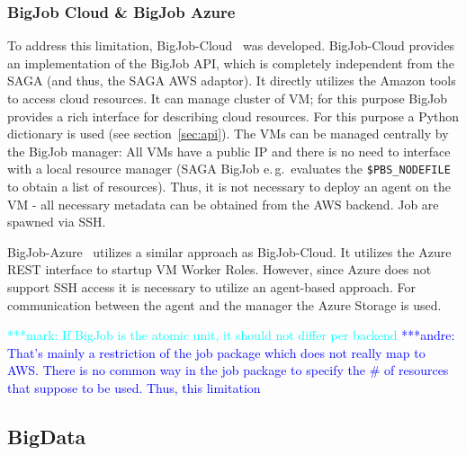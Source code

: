 \documentclass[conference,final]{IEEEtran}
\newcommand{\alnote}[1]{ {\textcolor{blue} { ***andre: #1 }}}
\newcommand{\msnote}[1]{ {\textcolor{cyan} { ***mark: #1 }}}
\newcommand{\alnote}[1]{}
\newcommand{\msnote}[1]{}
\begin{document}
\subsubsection{BigJob Cloud \& BigJob Azure}

To address this limitation, BigJob-Cloud~\cite{saga_bigjob_condor_cloud} was
developed. BigJob-Cloud provides an implementation of the BigJob API, which is
completely independent from the SAGA (and thus, the SAGA AWS adaptor). It
directly utilizes the Amazon tools to access cloud resources. It can manage
cluster of VM; for this purpose BigJob provides a rich interface for describing
cloud resources. For this purpose a Python dictionary is used (see
section~\ref{sec:api}). The VMs can be managed centrally by the BigJob manager:
All VMs have a public IP and there is no need to interface with a local resource
manager (SAGA BigJob e.\,g.\ evaluates the \texttt{\$PBS\_NODEFILE} to obtain a
list of resources). Thus, it is not necessary to deploy an agent on the VM - all
necessary metadata can be obtained from the AWS backend. Job are spawned via
SSH.



BigJob-Azure~\cite{10.1109/CloudCom.2010.85} utilizes a similar approach as
BigJob-Cloud. It utilizes the Azure REST interface to startup VM Worker Roles.
However, since Azure does not support SSH access it is necessary to utilize an
agent-based approach. For communication between the agent and the manager the
Azure Storage is used.

\msnote{If BigJob is the atomic unit, it should not differ per
  backend}\alnote{That's mainly a restriction of the job package which
  does not really map to AWS. There is no common way in the job
  package to specify the \# of resources that suppose to be
  used. Thus, this limitation}


\subsection{BigData}
\end{document}
